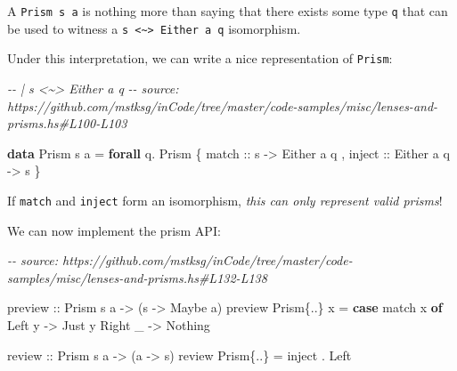 \documentclass[]{article}
\newenvironment{Shaded}{}{}
\newcommand{\CommentTok}[1]{\textcolor[rgb]{0.38,0.63,0.69}{\textit{#1}}}
\newcommand{\DataTypeTok}[1]{\textcolor[rgb]{0.56,0.13,0.00}{#1}}
\newcommand{\KeywordTok}[1]{\textcolor[rgb]{0.00,0.44,0.13}{\textbf{#1}}}
\newcommand{\NormalTok}[1]{#1}
\newcommand{\OperatorTok}[1]{\textcolor[rgb]{0.40,0.40,0.40}{#1}}
\newcommand{\OtherTok}[1]{\textcolor[rgb]{0.00,0.44,0.13}{#1}}
\begin{document}
A \texttt{Prism\textquotesingle{}\ s\ a} is nothing more than saying that there
exists some type \texttt{q} that can be used to witness a
\texttt{s\ \textless{}\textasciitilde{}\textgreater{}\ Either\ a\ q}
isomorphism.

Under this interpretation, we can write a nice representation of
\texttt{Prism\textquotesingle{}}:

\begin{Shaded}
\begin{Highlighting}[]
\CommentTok{{-}{-} | s <\textasciitilde{}> Either a q}
\CommentTok{{-}{-} source: https://github.com/mstksg/inCode/tree/master/code{-}samples/misc/lenses{-}and{-}prisms.hs\#L100{-}L103}

\KeywordTok{data} \DataTypeTok{Prism\textquotesingle{}}\NormalTok{ s a }\OtherTok{=} \KeywordTok{forall}\NormalTok{ q}\OperatorTok{.} \DataTypeTok{Prism\textquotesingle{}}
\NormalTok{    \{}\OtherTok{ match  ::}\NormalTok{ s }\OtherTok{{-}>} \DataTypeTok{Either}\NormalTok{ a q}
\NormalTok{    ,}\OtherTok{ inject ::} \DataTypeTok{Either}\NormalTok{ a q }\OtherTok{{-}>}\NormalTok{ s}
\NormalTok{    \}}
\end{Highlighting}
\end{Shaded}

If \texttt{match} and \texttt{inject} form an isomorphism, \emph{this can only
represent valid prisms}!

We can now implement the prism API:

\begin{Shaded}
\begin{Highlighting}[]
\CommentTok{{-}{-} source: https://github.com/mstksg/inCode/tree/master/code{-}samples/misc/lenses{-}and{-}prisms.hs\#L132{-}L138}

\OtherTok{preview ::} \DataTypeTok{Prism\textquotesingle{}}\NormalTok{ s a }\OtherTok{{-}>}\NormalTok{ (s }\OtherTok{{-}>} \DataTypeTok{Maybe}\NormalTok{ a)}
\NormalTok{preview }\DataTypeTok{Prism\textquotesingle{}}\NormalTok{\{}\OperatorTok{..}\NormalTok{\} x }\OtherTok{=} \KeywordTok{case}\NormalTok{ match x }\KeywordTok{of}
    \DataTypeTok{Left}\NormalTok{  y }\OtherTok{{-}>} \DataTypeTok{Just}\NormalTok{ y}
    \DataTypeTok{Right}\NormalTok{ \_ }\OtherTok{{-}>} \DataTypeTok{Nothing}

\OtherTok{review  ::} \DataTypeTok{Prism\textquotesingle{}}\NormalTok{ s a }\OtherTok{{-}>}\NormalTok{ (a }\OtherTok{{-}>}\NormalTok{ s)}
\NormalTok{review }\DataTypeTok{Prism\textquotesingle{}}\NormalTok{\{}\OperatorTok{..}\NormalTok{\} }\OtherTok{=}\NormalTok{ inject }\OperatorTok{.} \DataTypeTok{Left}
\end{Highlighting}
\end{Shaded}
\end{document}
